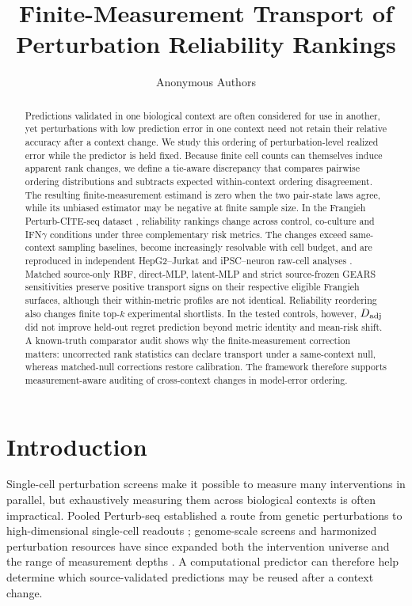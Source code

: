 \documentclass{article}
\title{Finite-Measurement Transport of Perturbation Reliability Rankings}
\author{Anonymous Authors}
\begin{document}
\maketitle

\begin{abstract}
Predictions validated in one biological context are often considered for use
in another, yet perturbations with low prediction error in one context need not
retain their relative accuracy after a context change. We study this ordering
of perturbation-level realized error while the predictor is held fixed. Because
finite cell counts can themselves induce apparent rank changes,
we define a tie-aware discrepancy that compares pairwise ordering
distributions and subtracts expected within-context ordering disagreement. The
resulting finite-measurement estimand is zero when the two pair-state laws
agree, while its unbiased estimator may be negative at finite sample size. In the
Frangieh Perturb-CITE-seq dataset \citep{frangieh2021multimodal}, reliability
rankings change across control, co-culture and IFN$\gamma$ conditions under
three complementary risk metrics. The changes exceed same-context sampling
baselines, become increasingly resolvable with cell budget, and are
reproduced in independent HepG2--Jurkat and iPSC--neuron raw-cell analyses
\citep{nadig2025trade,tian2019crispri}. Matched source-only RBF, direct-MLP, latent-MLP and
strict source-frozen GEARS sensitivities preserve positive transport signs on
their respective eligible Frangieh surfaces, although their within-metric profiles are not
identical. Reliability reordering also changes finite top-$k$ experimental
shortlists. In the tested controls, however, $D_{\rm adj}$ did not improve
held-out regret prediction beyond metric identity and mean-risk shift. A known-truth
comparator audit shows why the finite-measurement correction matters: uncorrected
rank statistics can declare transport under a same-context null, whereas
matched-null corrections restore calibration. The framework therefore supports
measurement-aware auditing of cross-context changes in model-error ordering.
\end{abstract}

\section{Introduction}
Single-cell perturbation screens make it possible to measure many interventions
in parallel, but exhaustively measuring them across biological contexts is
often impractical. Pooled Perturb-seq established a route from genetic
perturbations to high-dimensional single-cell readouts
\citep{dixit2016perturbseq,adamson2016parseq}; genome-scale screens and
harmonized perturbation resources have since expanded both the intervention
universe and the range of measurement depths \citep{replogle2022genome,
peidli2024scperturb}. A computational predictor can therefore help determine
which source-validated predictions may be reused after a context change.
\end{document}
